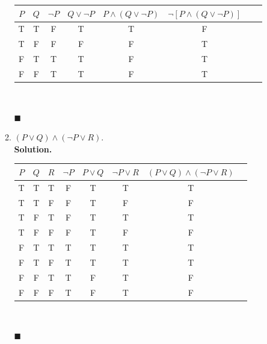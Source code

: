 \documentclass{report}
\newcommand{\sol}{\vspace{1em}\\\textbf{Solution.}\vspace{0.5em}}
\newcommand{\qed}{\ \\\strut\hfill$\blacksquare$\vspace{1em}}
\begin{document}
\begin{enumerate}[leftmargin=*]
\begin{enumerate}
                    \begin{center}
                        \begin{tabular}{cccccccc}
                            $P$ & $Q$ & $\neg P$ & $Q \vee \neg P$ & $P \wedge(Q \vee \neg P)$ & $\neg[P \wedge(Q \vee \neg P)]$ \\
                            \hline
                            T   & T   & F        & T               & T                         & F                               \\
                            T   & F   & F        & F               & F                         & T                               \\
                            F   & T   & T        & T               & F                         & T                               \\
                            F   & F   & T        & T               & F                         & T
                        \end{tabular}
                    \end{center}\qed
                    \newpage
              \item $(P \vee Q) \wedge(\neg P \vee R)$.
                    \sol{}
                    \begin{center}
                        \begin{tabular}{cccccccc}
                            $P$ & $Q$ & $R$ & $\neg P$ & $P \vee Q$ & $\neg P \vee R$ & $(P \vee Q) \wedge(\neg P \vee R)$ \\
                            \hline
                            T   & T   & T   & F        & T          & T               & T                                  \\
                            T   & T   & F   & F        & T          & F               & F                                  \\
                            T   & F   & T   & F        & T          & T               & T                                  \\
                            T   & F   & F   & F        & T          & F               & F                                  \\
                            F   & T   & T   & T        & T          & T               & T                                  \\
                            F   & T   & F   & T        & T          & T               & T                                  \\
                            F   & F   & T   & T        & F          & T               & F                                  \\
                            F   & F   & F   & T        & F          & T               & F
                        \end{tabular}
                    \end{center}\vspace{-2em}\qed
          \end{enumerate}


\end{enumerate}
\end{document}
